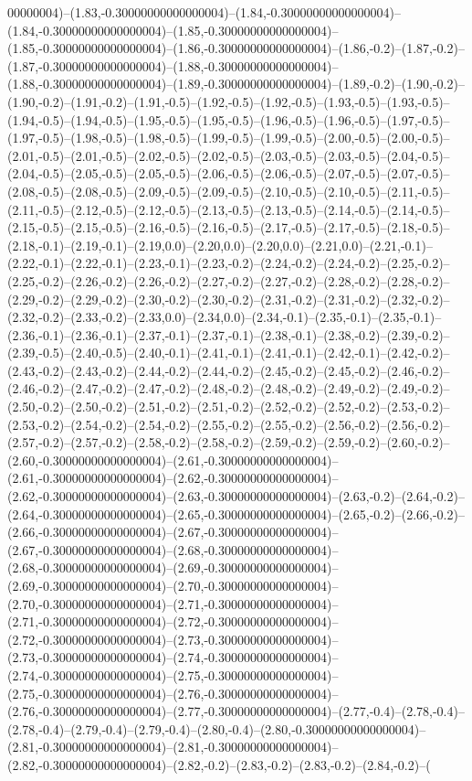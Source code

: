 00000004)--(1.83,-0.30000000000000004)--(1.84,-0.30000000000000004)--(1.84,-0.30000000000000004)--(1.85,-0.30000000000000004)--(1.85,-0.30000000000000004)--(1.86,-0.30000000000000004)--(1.86,-0.2)--(1.87,-0.2)--(1.87,-0.30000000000000004)--(1.88,-0.30000000000000004)--(1.88,-0.30000000000000004)--(1.89,-0.30000000000000004)--(1.89,-0.2)--(1.90,-0.2)--(1.90,-0.2)--(1.91,-0.2)--(1.91,-0.5)--(1.92,-0.5)--(1.92,-0.5)--(1.93,-0.5)--(1.93,-0.5)--(1.94,-0.5)--(1.94,-0.5)--(1.95,-0.5)--(1.95,-0.5)--(1.96,-0.5)--(1.96,-0.5)--(1.97,-0.5)--(1.97,-0.5)--(1.98,-0.5)--(1.98,-0.5)--(1.99,-0.5)--(1.99,-0.5)--(2.00,-0.5)--(2.00,-0.5)--(2.01,-0.5)--(2.01,-0.5)--(2.02,-0.5)--(2.02,-0.5)--(2.03,-0.5)--(2.03,-0.5)--(2.04,-0.5)--(2.04,-0.5)--(2.05,-0.5)--(2.05,-0.5)--(2.06,-0.5)--(2.06,-0.5)--(2.07,-0.5)--(2.07,-0.5)--(2.08,-0.5)--(2.08,-0.5)--(2.09,-0.5)--(2.09,-0.5)--(2.10,-0.5)--(2.10,-0.5)--(2.11,-0.5)--(2.11,-0.5)--(2.12,-0.5)--(2.12,-0.5)--(2.13,-0.5)--(2.13,-0.5)--(2.14,-0.5)--(2.14,-0.5)--(2.15,-0.5)--(2.15,-0.5)--(2.16,-0.5)--(2.16,-0.5)--(2.17,-0.5)--(2.17,-0.5)--(2.18,-0.5)--(2.18,-0.1)--(2.19,-0.1)--(2.19,0.0)--(2.20,0.0)--(2.20,0.0)--(2.21,0.0)--(2.21,-0.1)--(2.22,-0.1)--(2.22,-0.1)--(2.23,-0.1)--(2.23,-0.2)--(2.24,-0.2)--(2.24,-0.2)--(2.25,-0.2)--(2.25,-0.2)--(2.26,-0.2)--(2.26,-0.2)--(2.27,-0.2)--(2.27,-0.2)--(2.28,-0.2)--(2.28,-0.2)--(2.29,-0.2)--(2.29,-0.2)--(2.30,-0.2)--(2.30,-0.2)--(2.31,-0.2)--(2.31,-0.2)--(2.32,-0.2)--(2.32,-0.2)--(2.33,-0.2)--(2.33,0.0)--(2.34,0.0)--(2.34,-0.1)--(2.35,-0.1)--(2.35,-0.1)--(2.36,-0.1)--(2.36,-0.1)--(2.37,-0.1)--(2.37,-0.1)--(2.38,-0.1)--(2.38,-0.2)--(2.39,-0.2)--(2.39,-0.5)--(2.40,-0.5)--(2.40,-0.1)--(2.41,-0.1)--(2.41,-0.1)--(2.42,-0.1)--(2.42,-0.2)--(2.43,-0.2)--(2.43,-0.2)--(2.44,-0.2)--(2.44,-0.2)--(2.45,-0.2)--(2.45,-0.2)--(2.46,-0.2)--(2.46,-0.2)--(2.47,-0.2)--(2.47,-0.2)--(2.48,-0.2)--(2.48,-0.2)--(2.49,-0.2)--(2.49,-0.2)--(2.50,-0.2)--(2.50,-0.2)--(2.51,-0.2)--(2.51,-0.2)--(2.52,-0.2)--(2.52,-0.2)--(2.53,-0.2)--(2.53,-0.2)--(2.54,-0.2)--(2.54,-0.2)--(2.55,-0.2)--(2.55,-0.2)--(2.56,-0.2)--(2.56,-0.2)--(2.57,-0.2)--(2.57,-0.2)--(2.58,-0.2)--(2.58,-0.2)--(2.59,-0.2)--(2.59,-0.2)--(2.60,-0.2)--(2.60,-0.30000000000000004)--(2.61,-0.30000000000000004)--(2.61,-0.30000000000000004)--(2.62,-0.30000000000000004)--(2.62,-0.30000000000000004)--(2.63,-0.30000000000000004)--(2.63,-0.2)--(2.64,-0.2)--(2.64,-0.30000000000000004)--(2.65,-0.30000000000000004)--(2.65,-0.2)--(2.66,-0.2)--(2.66,-0.30000000000000004)--(2.67,-0.30000000000000004)--(2.67,-0.30000000000000004)--(2.68,-0.30000000000000004)--(2.68,-0.30000000000000004)--(2.69,-0.30000000000000004)--(2.69,-0.30000000000000004)--(2.70,-0.30000000000000004)--(2.70,-0.30000000000000004)--(2.71,-0.30000000000000004)--(2.71,-0.30000000000000004)--(2.72,-0.30000000000000004)--(2.72,-0.30000000000000004)--(2.73,-0.30000000000000004)--(2.73,-0.30000000000000004)--(2.74,-0.30000000000000004)--(2.74,-0.30000000000000004)--(2.75,-0.30000000000000004)--(2.75,-0.30000000000000004)--(2.76,-0.30000000000000004)--(2.76,-0.30000000000000004)--(2.77,-0.30000000000000004)--(2.77,-0.4)--(2.78,-0.4)--(2.78,-0.4)--(2.79,-0.4)--(2.79,-0.4)--(2.80,-0.4)--(2.80,-0.30000000000000004)--(2.81,-0.30000000000000004)--(2.81,-0.30000000000000004)--(2.82,-0.30000000000000004)--(2.82,-0.2)--(2.83,-0.2)--(2.83,-0.2)--(2.84,-0.2)--(